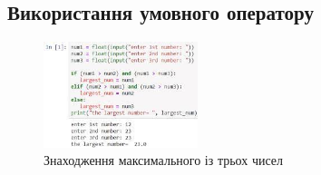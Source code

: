  \subsection{Використання умовного оператору} 
\begin{frame}
\begin{figure}
\begin{center}
 \includegraphics[width=0.4\textwidth]{pictures/largest_number.jpeg}
\caption{Знаходження максимального із трьох чисел}
\label{largest_number} 
\end{center}
\end{figure}
\end{frame}
